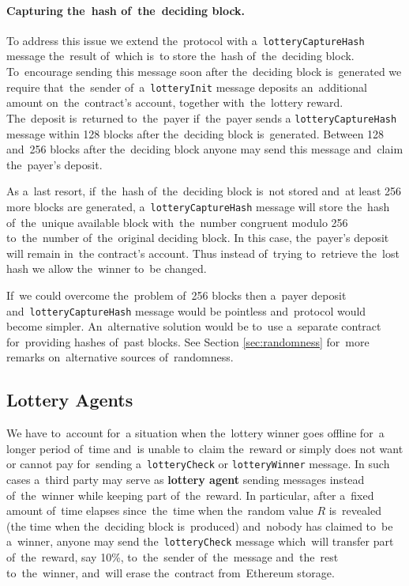 \documentclass[a4paper]{article}
\begin{document}
    \paragraph{Capturing the~hash of~the~deciding block.}

    To address this issue we extend the~protocol with a~\texttt{lotteryCaptureHash} message the~result of~which is~to
    store the~hash of~the~deciding block. To~encourage sending this message soon after the~deciding block is~generated
    we require that~the~sender of~a~\texttt{lotteryInit} message deposits an~additional amount on~the~contract's
    account, together with~the~lottery reward. The~deposit is~returned to~the~payer if~the~payer sends a
    \texttt{lotteryCaptureHash} message within 128 blocks after the~deciding block is~generated.
    Between 128 and~256 blocks after the~deciding block anyone may send this message and~claim the~payer's deposit.

    As a~last resort, if~the~hash of~the~deciding block is~not stored and~at least 256 more blocks are generated,
    a~\texttt{lotteryCaptureHash} message will store the~hash of~the~unique available block with~the~number congruent
    modulo 256 to~the~number of~the~original deciding block. In this case, the~payer's deposit will remain in~the
    contract's account. Thus instead of~trying to~retrieve the~lost hash we allow the~winner to~be changed.

    If~we could overcome the~problem of~256 blocks then a~payer deposit and~\texttt{lotteryCaptureHash} message would
    be pointless and~protocol would become simpler. An~alternative solution would be to~use a~separate contract
    for~providing hashes of~past blocks. See Section \ref{sec:randomness} for~more remarks on~alternative sources
    of~randomness.
    
\subsection{Lottery Agents}
    We have to~account for~a situation when the~lottery winner goes offline for~a longer period of~time and~is
    unable to~claim the~reward or simply does not want or cannot pay for~sending a~\texttt{lotteryCheck} or
    \texttt{lotteryWinner} message. In such cases a~third party may serve as \textbf{lottery agent} sending messages
    instead of~the~winner while keeping part of~the~reward. In particular, after a~fixed amount of~time elapses
    since~the~time when the~random value $R$ is~revealed (the time when the~deciding block is~produced) and~nobody has
    claimed to~be a~winner, anyone may send the~\texttt{lotteryCheck} message which~will transfer part of~the~reward,
    say 10\%, to~the~sender of~the~message and~the~rest to~the~winner, and~will erase the~contract from~Ethereum
    storage.
\end{document}

